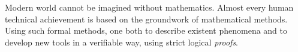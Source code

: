 \documentclass[article]{aaltoseries}
\begin{document}
Modern world cannot be imagined without mathematics. Almost every human technical achievement is based on the groundwork of mathematical methods. Using such formal methods, one both to describe existent phenomena and to develop new tools in a verifiable way, using strict logical \textit{proofs}.
\end{document}
